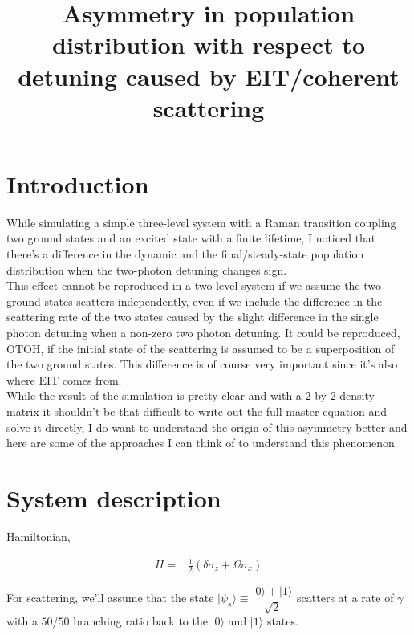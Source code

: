 \documentclass[10pt,fleqn]{article}
\title{Asymmetry in population distribution with respect to detuning caused by EIT/coherent scattering}
\newcommand{\eqar}[1]
{
  \begin{align}
    #1
  \end{align}
}
\newcommand{\paren}[1]{{\left({#1}\right)}}
\begin{document}
\maketitle

\section{Introduction}
While simulating a simple three-level system with a Raman transition
coupling two ground states and an excited state with a finite lifetime,
I noticed that there's a difference in the dynamic
and the final/steady-state population distribution when the two-photon detuning
changes sign.\\

This effect cannot be reproduced in a two-level system
if we assume the two ground states scatters independently,
even if we include the difference in the scattering rate of the two states
caused by the slight difference in the single photon detuning
when a non-zero two photon detuning.
It could be reproduced, OTOH, if the initial state of the scattering
is assumed to be a superposition of the two ground states.
This difference is of course very important since it's also where EIT comes from.\\

While the result of the simulation is pretty clear and with a $2$-by-$2$ density matrix
it shouldn't be that difficult to write out the full master equation
and solve it directly, I do want to understand the origin of this asymmetry better
and here are some of the approaches I can think of to understand this phenomenon.\\

\section{System description}
Hamiltonian,
\eqar{
  H=&\frac12\paren{\delta\sigma_z+\Omega\sigma_x}
}
For scattering, we'll assume that the state
$|\psi_s\rangle\equiv\dfrac{|0\rangle+|1\rangle}{\sqrt2}$
scatters at a rate of $\gamma$ with a $50$/$50$ branching ratio back to
the $|0\rangle$ and $|1\rangle$ states.
\end{document}
